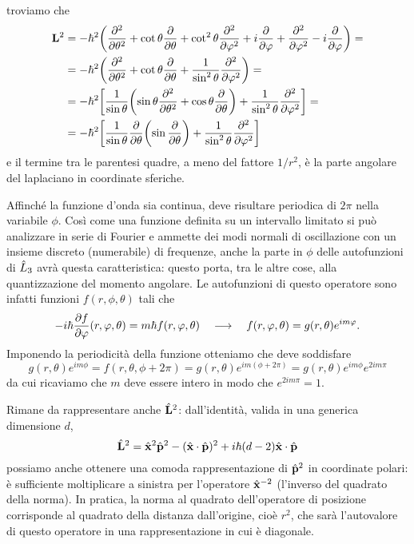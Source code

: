 troviamo che
\begin{equation}
	\begin{split}
		\mathbf{L}^2&=-\hbar^2\bigg(\frac{\partial^2 {}}{\partial {\theta}^2}+\cot\theta\frac{\partial {}}{\partial {\theta}}+\cot^2\theta\frac{\partial^2 {}}{\partial {\varphi}^2}+i\frac{\partial {}}{\partial {\varphi}}+\frac{\partial^2 {}}{\partial {\varphi}^2}-i\frac{\partial {}}{\partial {\varphi}}\bigg)=\\
		&=-\hbar^2\bigg(\frac{\partial^2 {}}{\partial {\theta}^2}+\cot\theta\frac{\partial {}}{\partial {\theta}}+\frac1{\sin^2\theta}\frac{\partial^2 {}}{\partial {\varphi}^2}\bigg)=\\
		&=-\hbar^2\bigg[\frac1{\sin\theta}\bigg(\!\sin\theta\frac{\partial^2 {}}{\partial {\theta}^2}+\cos\theta\frac{\partial {}}{\partial {\theta}}\bigg)+\frac1{\sin^2\theta}\frac{\partial^2 {}}{\partial {\varphi}^2}\bigg]=\\
		&=-\hbar^2\bigg[\frac1{\sin\theta}\frac{\partial {}}{\partial {\theta}}\bigg(\!\sin\frac{\partial {}}{\partial {\theta}}\bigg)+\frac1{\sin^2\theta}\frac{\partial^2 {}}{\partial {\varphi}^2}\bigg]
	\end{split}
	\label{eq:L^2-schroedinger}
\end{equation}
e il termine tra le parentesi quadre, a meno del fattore $1/r^2$, è la parte angolare del laplaciano in coordinate sferiche.

Affinch\'e la funzione d'onda sia continua, deve risultare periodica di $2\pi$ nella variabile $\phi$.
Cos\`i come una funzione definita su un intervallo limitato si può analizzare in serie di Fourier e ammette dei modi normali di oscillazione con un insieme discreto (numerabile) di frequenze, anche la parte in $\phi$ delle autofunzioni di $\hat{L}_3$ avrà questa caratteristica: questo porta, tra le altre cose, alla quantizzazione del momento angolare.
Le autofunzioni di questo operatore sono infatti funzioni $f(r,\phi,\theta)$ tali che
\begin{equation}
	-i\hbar\frac{\partial {f}}{\partial {\varphi}}(r,\varphi,\theta)=m\hbar f(r,\varphi,\theta)\quad\longrightarrow\quad f(r,\varphi,\theta)=g(r,\theta)e^{im\varphi}.
\end{equation}
Imponendo la periodicità della funzione otteniamo che deve soddisfare
\begin{equation}
	g(r,\theta)e^{im\phi}=f(r,\theta,\phi+2\pi)=g(r,\theta)e^{im(\phi+2\pi)}=g(r,\theta)e^{im\phi}e^{2im\pi}
\end{equation}
da cui ricaviamo che $m$ deve essere intero in modo che $e^{2im\pi}=1$.


Rimane da rappresentare anche $\hat{\mathbf{L}}^2$: dall'identità, valida in una generica dimensione $d$,
\begin{equation}
	\hat{\mathbf{L}}^2=\hat{\mathbf{x}}^2\hat{\mathbf{p}}^2-({\hat{\mathbf{x}}}\cdot{\hat{\mathbf{p}}})^2+i\hbar(d-2){\hat{\mathbf{x}}}\cdot{\hat{\mathbf{p}}}
	\label{eq:relazione-L2-x-p}
\end{equation}
possiamo anche ottenere una comoda rappresentazione di $\hat{\mathbf{p}}^2$ in coordinate polari: è sufficiente moltiplicare a sinistra per l'operatore $\hat{\mathbf{x}}^{-2}$ (l'inverso del quadrato della norma).
In pratica, la norma al quadrato dell'operatore di posizione corrisponde al quadrato della distanza dall'origine, cioè $r^2$, che sarà l'autovalore di questo operatore in una rappresentazione in cui è diagonale.

